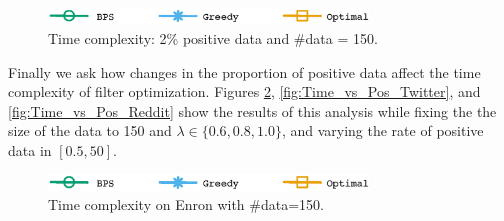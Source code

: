 \begin{figure}[H]
\begin{centering}
\includegraphics[width=8.5cm]{imgs/legend2}
\par\end{centering}
\begin{centering}
\par\end{centering}
\caption{Time complexity: 2\% positive data and  \#data = 150.}
\label{fig:Time_vs_Lambda}
\end{figure}

 Finally we ask how changes in the proportion of positive data affect the time complexity of filter optimization.  Figures \ref{fig:Time_vs_Pos_Enron}, \ref{fig:Time_vs_Pos_Twitter}, and \ref{fig:Time_vs_Pos_Reddit} show the results of this analysis while fixing the  the size of the data to 150 and $\lambda\in \{0.6,0.8,1.0\}$, and varying the rate of positive data in $[0.5,50]$.

\begin{figure}[H]
\begin{centering}
\includegraphics[width=8.5cm]{imgs/legend2}
\par\end{centering}
\begin{centering}
\par\end{centering}
\caption{Time complexity on Enron with \#data=150.}
\label{fig:Time_vs_Pos_Enron}
\end{figure}


